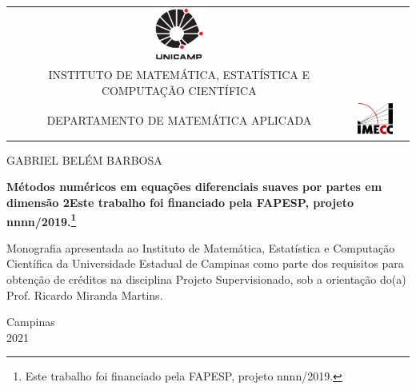 \documentclass[12pt,a4paper]{article}
\newcommand{\aluno}{GABRIEL BELÉM BARBOSA}
\newcommand{\orientador}{Prof. Ricardo Miranda Martins}
\newcommand{\titulo}{Métodos numéricos em equações diferenciais suaves por partes
em dimensão 2}
\newcommand{\bolsa}{Este trabalho foi financiado pela FAPESP, projeto nnnn/2019.}
\newcommand{\ano}{2021}
\begin{document}
\pagestyle{empty}
\sffamily
\begin{center}
\begin{tabular}{ccc}
  \begin{minipage}{1.6cm}
    \includegraphics[width=1.6cm]{unicamp.pdf}
  \end{minipage}
  &
  \begin{minipage}{13.7cm}
    \centering\small
  UNIVERSIDADE ESTADUAL DE CAMPINAS\\
  INSTITUTO DE MATEMÁTICA, ESTATÍSTICA E COMPUTAÇÃO CIENTÍFICA\\
  DEPARTAMENTO DE MATEMÁTICA APLICADA
  \end{minipage}
  &
  \begin{minipage}{1.6cm}
    \includegraphics[width=1.6cm]{imecc.pdf}
  \end{minipage}
\end{tabular}


\vspace{3.5cm}

{\large \aluno}

\vspace{3.5cm}

{
  \bfseries\Large
      {\titulo}\ifx\bolsa\undefined\else\footnote{\bolsa}\fi
}
\end{center}

\vspace{3.5cm}

\begin{flushright}
  \begin{minipage}{9cm}
  Monografia apresentada ao Instituto de Matemática, Estatística e
  Computação Científica da Universidade Estadual de Campinas como
  parte dos requisitos para obtenção de créditos na disciplina Projeto
  Supervisionado, sob a orientação do(a) {\orientador}.
  \end{minipage}
\end{flushright}

\vspace{3cm}

\begin{center}
  Campinas\\
  \ano
\end{center}
  
\end{document}
